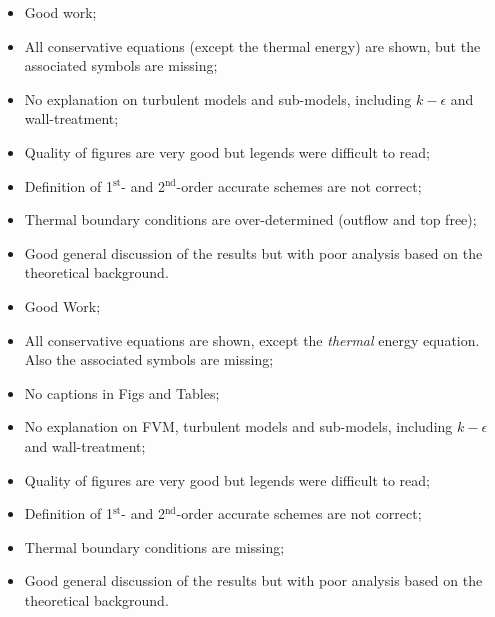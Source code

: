 \documentclass[14pt,twoside]{report}
\newcommand\blankpage{%
    \null
    \thispagestyle{empty}%
    \addtocounter{page}{-1}%
    \newpage}
\begin{document}


\bigskip


\medskip

  \begin{itemize}
%
     \item Good work;
     \item All conservative equations (except the thermal energy) are shown, but the associated symbols are missing;
     \item No explanation on turbulent models and sub-models, including $k-\epsilon$ and wall-treatment;%
     \item Quality of figures are very good but legends were difficult to read;
     \item Definition of 1$^{\text{st}}$- and 2$^{\text{nd}}$-order accurate schemes are not correct;
     \item Thermal boundary conditions are over-determined (outflow and top free);
     \item Good general discussion of the results but with poor analysis based on the theoretical background.
%
  \end{itemize}%

\clearpage 





\bigskip


\medskip

  \begin{itemize}
%
     \item Good Work;
     \item All conservative equations are shown, except the {\it thermal} energy equation. Also the associated symbols are missing;
     \item No captions in Figs and Tables;
     \item No explanation on FVM, turbulent models and sub-models, including $k-\epsilon$ and wall-treatment;%
     \item Quality of figures are very good but legends were difficult to read;
     \item Definition of 1$^{\text{st}}$- and 2$^{\text{nd}}$-order accurate schemes are not correct;
     \item Thermal boundary conditions are missing;
     \item Good general discussion of the results but with poor analysis based on the theoretical background.
%
  \end{itemize}%
\end{document}
